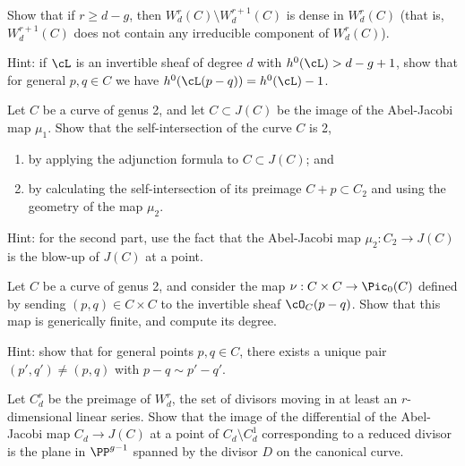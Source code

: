 \begin{exercise}
Show that if $r \geq d-g$, then $W^r_d(C) \setminus W^{r+1}_d(C)$ is dense in $W^r_d(C)$ (that is, $W^{r+1}_d(C)$ does not contain any irreducible component of $W^r_d(C)$).

Hint: if $\cL$ is an invertible sheaf of degree $d$ with $h^0(\cL) > d-g+1$, show that for general $p, q \in C$ we have $h^0(\cL(p-q))  = h^0(\cL) - 1$.
\end{exercise}

\begin{exercise}
Let $C$ be a curve of genus 2, and let $C \subset J(C)$ be the image of the Abel-Jacobi map $\mu_1$. Show that the self-intersection of the curve $C$ is 2,
\begin{enumerate}
\item by applying the adjunction formula to $C \subset J(C)$; and
\item by calculating the self-intersection of its preimage $C + p \subset C_2$ and using the geometry of the map $\mu_2$.
\end{enumerate}

Hint: for the second part, use the fact that the Abel-Jacobi map $\mu_2 : C_2 \to J(C)$ is the blow-up of $J(C)$ at a point.
\end{exercise}

\begin{exercise}
Let $C$ be a curve of genus 2, and consider the map $\nu : C \times C \to \Pic_0(C)$ defined by sending $(p, q)\in C \times C$ to the invertible sheaf $\cO_C(p-q)$. Show that this map is generically finite, and compute its degree.

Hint: show that for general points $p, q \in C$, there exists a unique pair $(p',q') \neq (p,q)$ with $p - q \sim p'-q'$.
\end{exercise}

\begin{exercise} \label{comparison with geometric RR}
Let $C^{r}_{d}$ be the preimage of $W^{r}_{d}$, the set of divisors moving in at least an $r$-dimensional linear series.
Show that the image of the differential of the Abel-Jacobi map $C_{d} \to J(C)$ at a point of $C_{d} \setminus C^1_d$  corresponding to a reduced divisor is  the plane in $\PP^{g-1}$ spanned by the divisor $D$ on the canonical curve.

\end{exercise}

